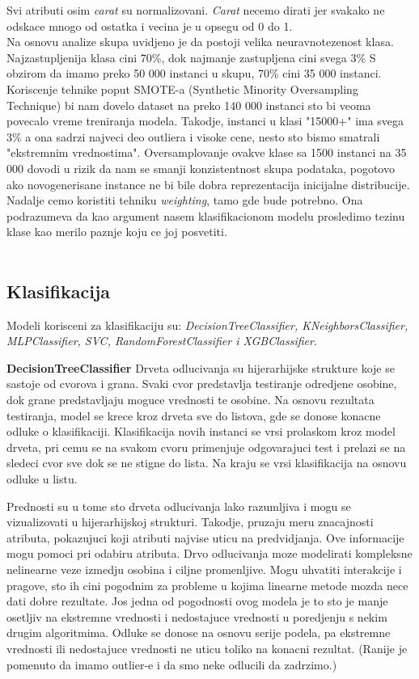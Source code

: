 \documentclass[10pt]{article}
\begin{document}
Svi atributi osim \textit{carat} su normalizovani. \textit{Carat} necemo dirati jer svakako ne odskace mnogo od ostatka i vecina je u opsegu od 0 do 1.\\

Na osnovu analize skupa uvidjeno je da postoji velika neuravnotezenost klasa. Najzastupljenija klasa cini 70\%, dok najmanje zastupljena cini svega 3\%
S obzirom da imamo preko 50 000 instanci u skupu, 70\% cini 35 000 instanci. Koriscenje tehnike poput SMOTE-a (Synthetic Minority Oversampling Technique) bi nam dovelo dataset na preko 140 000 instanci sto bi veoma povecalo vreme treniranja modela.
Takodje, instanci u klasi "15000+" ima svega 3\% a ona sadrzi najveci deo outliera i visoke cene, nesto sto bismo smatrali "ekstremnim vrednostima". Oversamplovanje ovakve klase sa 1500 instanci na 35 000 dovodi u rizik da nam se smanji konzistentnost skupa podataka, pogotovo ako novogenerisane instance ne bi bile dobra reprezentacija inicijalne distribucije. Nadalje cemo koristiti tehniku \textit{weighting}, tamo gde bude potrebno. Ona podrazumeva da kao argument nasem klasifikacionom modelu prosledimo tezinu klase kao merilo paznje koju ce joj posvetiti.\\\\

\subsection{Klasifikacija}
Modeli korisceni za klasifikaciju su: \textit{DecisionTreeClassifier, KNeighborsClassifier, MLPClassifier, SVC, RandomForestClassifier i XGBClassifier}.

\textbf{DecisionTreeClassifier}
Drveta odlucivanja su hijerarhijske strukture koje se sastoje od cvorova i grana. Svaki cvor predstavlja testiranje odredjene osobine, dok grane predstavljaju moguce vrednosti te osobine. Na osnovu rezultata testiranja, model se krece kroz drveta sve do listova, gde se donose konacne odluke o klasifikaciji. Klasifikacija novih instanci se vrsi prolaskom kroz model drveta, pri cemu se na svakom cvoru primenjuje odgovarajuci test i prelazi se na sledeci cvor sve dok se ne stigne do lista. Na kraju se vrsi klasifikacija na osnovu odluke u listu.

Prednosti su u tome sto drveta odlucivanja lako razumljiva i mogu se vizualizovati u hijerarhijskoj strukturi. Takodje, pruzaju meru znacajnosti atributa, pokazujuci koji atributi najvise uticu na predvidjanja. Ove informacije mogu pomoci pri odabiru atributa. Drvo odlucivanja moze modelirati kompleksne nelinearne veze izmedju osobina i ciljne promenljive. Mogu uhvatiti interakcije i pragove, sto ih cini pogodnim za probleme u kojima linearne metode mozda nece dati dobre rezultate. Jos jedna od pogodnosti ovog modela je to sto je manje osetljiv na ekstremne vrednosti i nedostajuce vrednosti u poredjenju s nekim drugim algoritmima. Odluke se donose na osnovu serije podela, pa ekstremne vrednosti ili nedostajuce vrednosti ne uticu toliko na konacni rezultat. (Ranije je pomenuto da imamo outlier-e i da smo neke odlucili da zadrzimo.)\\
\end{document}
